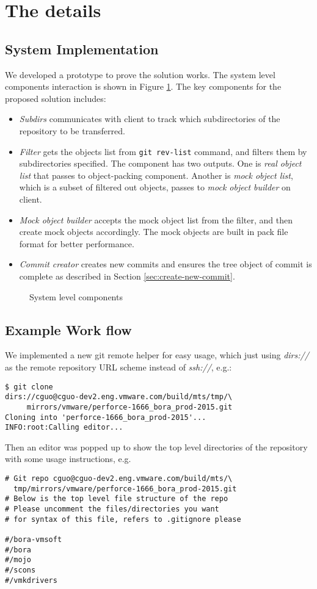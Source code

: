 \documentclass[preprint]{sigplanconf}
\begin{document}
\section{The details}
\subsection{System Implementation}
We developed a prototype to prove the solution works.
The system level components interaction is shown in Figure
\ref{fig:components}.
The key components for the proposed solution includes:
\begin{itemize}
  \item \emph{Subdirs} communicates with client to track which subdirectories
    of the repository to be transferred.
  \item \emph{Filter} gets the objects list from
    \verb|git rev-list| command, and filters them by subdirectories specified.
    The component has two outputs.
    One is \emph{real object list} that passes to object-packing component.
    Another is \emph{mock object list}, which is a subset of filtered out
    objects, passes to \emph{mock object builder} on client.
  \item \emph{Mock object builder} accepts the mock object list
    from the filter, and then create mock objects accordingly.
    The mock objects are built in pack file format\cite{packformat} for better
    performance.
  \item \emph{Commit creator} creates new commits and ensures
    the tree object of commit is complete as described in Section
    \ref{sec:create-new-commit}.
\end{itemize}
\begin{figure}[htpb]
  \centering
  
  \caption{System level components}
  \label{fig:components}
\end{figure}

\subsection{Example Work flow}
We implemented a new git remote helper\cite{git-remote-helper} for easy usage,
which just using \emph{dirs://} as the remote repository URL scheme instead of
\emph{ssh://}, e.g.:
\begin{verbatim}
$ git clone
dirs://cguo@cguo-dev2.eng.vmware.com/build/mts/tmp/\
     mirrors/vmware/perforce-1666_bora_prod-2015.git
Cloning into 'perforce-1666_bora_prod-2015'...
INFO:root:Calling editor...
\end{verbatim}
Then an editor was popped up to show the top level directories of the
repository with some usage instructions, e.g.
\begin{verbatim}
# Git repo cguo@cguo-dev2.eng.vmware.com/build/mts/\
  tmp/mirrors/vmware/perforce-1666_bora_prod-2015.git
# Below is the top level file structure of the repo
# Please uncomment the files/directories you want
# for syntax of this file, refers to .gitignore please

#/bora-vmsoft
#/bora
#/mojo
#/scons
#/vmkdrivers
\end{verbatim}
\end{document}
